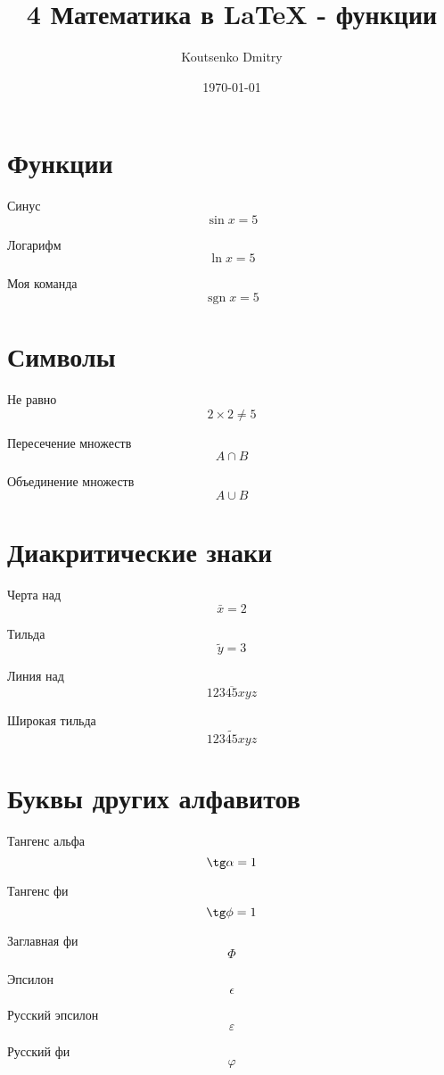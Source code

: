 \documentclass[a4paper,12pt]{article}                       %
\title{4 Математика в \LaTeX{} - функции}
\author{Koutsenko Dmitry}
\date{\today}
\DeclareMathOperator{\sgn}{\mathop{sgn}}
\begin{document}

\maketitle

\section{Функции}

Синус \[ \sin x = 5 \]

Логарифм \[ \ln x = 5 \]

Моя команда \[ \sgn x = 5 \]

\section{Символы}

Не равно \[ 2\times 2 \ne 5 \]

Пересечение множеств \[ A \cap B \]

Объединение множеств \[ A \cup B \]

\section{Диакритические знаки}

Черта над \[ \bar x = 2 \]

Тильда \[ \tilde y = 3 \]

Линия над \[ \overline{12345xyz} \]

Широкая тильда \[ \widetilde{12345xyz} \]

\section{Буквы других алфавитов}

Тангенс альфа \[ \tg \alpha = 1 \]

Тангенс фи \[ \tg \phi = 1 \]

Заглавная фи \[ \Phi \]

Эпсилон \[ \epsilon \]

Русский эпсилон \[ \varepsilon \]

Русский фи \[ \varphi \]

\end{document}
